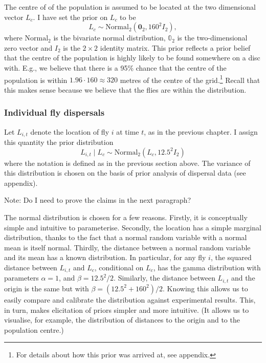 \documentclass[
]{book}
\begin{document}
The centre of of the population is assumed to be located at the two dimensional vector \(L_c\). I have set the prior on \(L_c\) to be
\[
L_c \sim \mathrm {Normal}_2 (\mathbf 0_2, 160^2 I_2),
\]
where \(\mathrm{Normal}_2\) is the bivariate normal distribution, \(\mathbb 0_2\) is the two-dimensional zero vector and \(I_2\) is the \(2 \times 2\) identity matrix. This prior reflects a prior belief that the centre of the population is highly likely to be found somewhere on a disc with. E.g., we believe that there is a 95\% chance that the centre of the population is within \(1.96 \cdot 160 \approx 320\) metres of the centre of the grid.\footnote{For details about how this prior was arrived at, see appendix.} Recall that this makes sense because we believe that the flies are within the distribution.

\hypertarget{individual-fly-dispersals}{%
\subsubsection{Individual fly dispersals}\label{individual-fly-dispersals}}

Let \(L_{i, t}\) denote the location of fly \(i\) at time \(t\), as in the previous chapter. I assign this quantity the prior distribution
\[
L_{i, t} \mid L_c \sim \mathrm {Normal}_2 (L_c, 12.5^2 I_2)
\]
where the notation is defined as in the previous section above. The variance of this distribution is chosen on the basis of prior analysis of dispersal data (see appendix).

Note: Do I need to prove the claims in the next paragraph?

The normal distribution is chosen for a few reasons. Firstly, it is conceptually simple and intuitive to parameterise. Secondly, the location has a simple marginal distribution, thanks to the fact that a normal random variable with a normal mean is itself normal. Thirdly, the distance between a normal random variable and its mean has a known distribution. In particular, for any fly \(i\), the squared distance between \(L_{i,t}\) and \(L_c\), conditional on \(L_c\), has the gamma distribution with parameters \(\alpha = 1\), and \(\beta = 12.5^2 / 2\). Similarly, the distance between \(L_{i, t}\) and the origin is the same but with \(\beta = (12.5^2 + 160^2) / 2\). Knowing this allows us to easily compare and calibrate the distribution against experimental results. This, in turn, makes elicitation of priors simpler and more intuitive. (It allows us to visualise, for example, the distribution of distances to the origin and to the population centre.)
\end{document}
